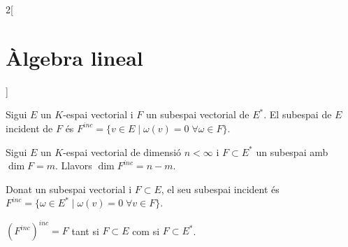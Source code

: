 \documentclass[class=article,10pt,crop=false]{standalone}
\begin{document}
\begin{multicols}{2}[\section{Àlgebra lineal}]
\begin{definition}
\end{definition}
\begin{definition}
Sigui $E$ un $K$-espai vectorial i $F$ un subespai vectorial de $E^*$. El subespai de $E$ incident de $F$ és $F^{inc}=\{v\in E\mid \omega(v)=0\;\forall\omega\in F\}$.
\end{definition}
\begin{theorem}
Sigui $E$ un $K$-espai vectorial de dimensió $n<\infty$ i $F\subset E^*$ un subespai amb $\dim F=m$. Llavors $\dim F^{inc}=n-m$.
\end{theorem}
\begin{definition}
Donat un subespai vectorial i $F\subset E$, el seu subespai incident és $F^{inc}=\{\omega\in E^*\mid \omega(v)=0\;\forall v\in F\}$.
\end{definition}
\begin{prop}
$(F^{inc})^{inc}=F$ tant si $F\subset E$ com si $F\subset E^*$.
\end{prop}

\end{multicols}
\end{document}
